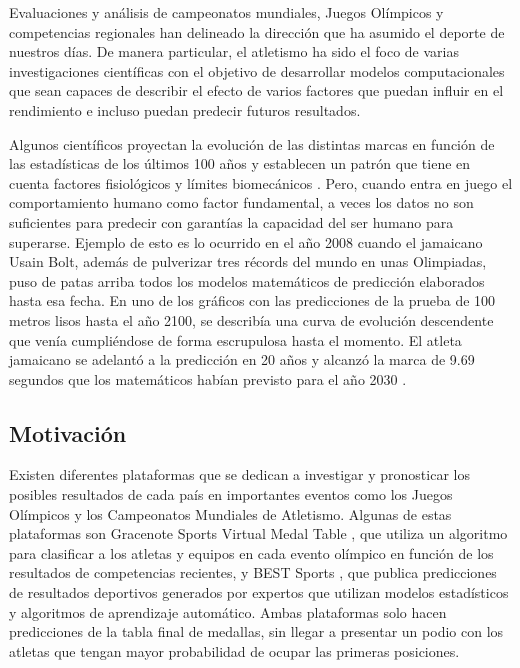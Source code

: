 Evaluaciones y análisis de campeonatos mundiales, Juegos Olímpicos y competencias regionales han delineado la dirección que ha asumido el deporte de nuestros días. De manera particular, el atletismo ha sido el foco de varias investigaciones científicas \cite{grubb1998models}\cite{westera2011phenomenology}\cite{godsey2012brian} con el objetivo de desarrollar modelos computacionales que sean capaces de describir el efecto de varios factores que puedan influir en el rendimiento e incluso puedan predecir futuros resultados.

Algunos científicos proyectan la evolución de las distintas marcas en función de las estadísticas de los últimos 100 años y establecen un patrón que tiene en cuenta factores fisiológicos y límites biomecánicos \cite{kumarforecasting}\cite{mishra2013mathematical}. Pero, cuando entra en juego el comportamiento humano como factor fundamental, a veces los datos no son suficientes para predecir con garantías la capacidad del ser humano para superarse. Ejemplo de esto es lo ocurrido en el año 2008 cuando el jamaicano Usain Bolt, además de pulverizar tres récords del mundo en unas Olimpiadas, puso de patas arriba todos los modelos matemáticos de predicción elaborados hasta esa fecha. En uno de los gráficos con las predicciones de la prueba de 100 metros lisos hasta el año 2100, se describía una curva de evolución descendente que venía cumpliéndose de forma escrupulosa hasta el momento. El atleta jamaicano se adelantó a la predicción en 20 años y alcanzó la marca de 9.69 segundos que los matemáticos habían previsto para el año 2030 \cite{wired}.

\subsection*{Motivación}

Existen diferentes plataformas que se dedican a investigar y pronosticar los posibles resultados de cada país en importantes eventos como los Juegos Olímpicos y los Campeonatos Mundiales de Atletismo. Algunas de estas plataformas son Gracenote Sports Virtual Medal Table \cite{gracenote}, que utiliza un algoritmo para clasificar a los atletas y equipos en cada evento olímpico en función de los resultados de competencias recientes, y BEST Sports \cite{bestsports}, que publica predicciones de resultados deportivos generados por expertos que utilizan modelos estadísticos y algoritmos de aprendizaje automático. Ambas plataformas solo hacen predicciones de la tabla final de medallas, sin llegar a presentar un podio con los atletas que tengan mayor probabilidad de ocupar las primeras posiciones.  

